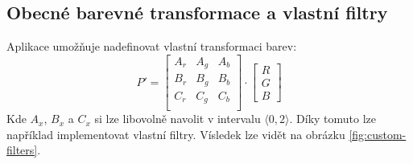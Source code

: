 \documentclass[11pt, a4paper, titlepage]{article}
\begin{document}
\subsection{Obecné barevné transformace a vlastní filtry}
Aplikace umožňuje nadefinovat vlastní transformaci barev:
$$
P'
=
\begin{bmatrix}
    A_r & A_g & A_b \\
    B_r & B_g & B_b \\
    C_r & C_g & C_b \\
\end{bmatrix}
\cdot
\begin{bmatrix}R\\G\\B\end{bmatrix}
$$
Kde $A_x$, $B_x$ a $C_x$ si lze libovolně navolit v intervalu $\langle0, 2\rangle$.
Díky tomuto lze například implementovat vlastní filtry.
Vísledek lze vidět na obrázku \ref{fig:custom-filters}.
\end{document}
